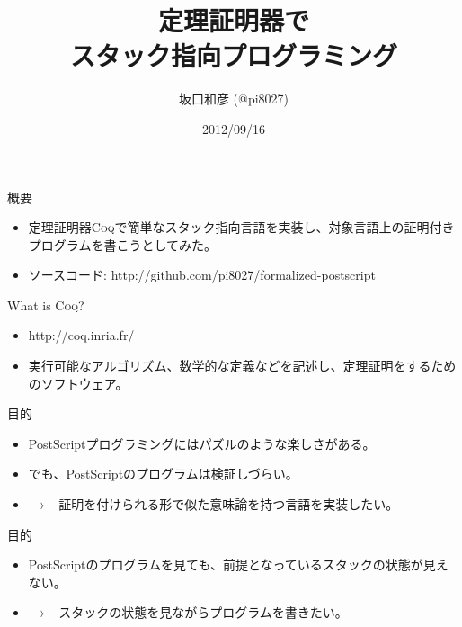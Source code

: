 \documentclass[cjk, 14pt, dvipdfm]{beamer}
\title{定理証明器\Coq{}で\\スタック指向プログラミング}
\author{坂口和彦 (@pi8027)}
\institute{筑波大学 情報学群 情報科学類 B2}
\date{2012/09/16}
\newcommand{\Coq}{{\scshape{}Coq}}
\begin{document}
\begin{frame}[plain]

 \maketitle

\end{frame}

\begin{frame}{概要}

  \begin{itemize}
    \item 定理証明器\Coq{}で簡単なスタック指向言語を実装し、対象言語上の証明付きプログラムを書こうとしてみた。
    \item ソースコード: http://github.com/pi8027/formalized-postscript
  \end{itemize}

\end{frame}

\begin{frame}{What is \Coq?}

  \begin{itemize}
    \item http://coq.inria.fr/
    \item 実行可能なアルゴリズム、数学的な定義などを記述し、定理証明をするためのソフトウェア。
  \end{itemize}

\end{frame}

\begin{frame}{目的}

  \begin{itemize}
    \item PostScriptプログラミングにはパズルのような楽しさがある。
    \item でも、PostScriptのプログラムは検証しづらい。
    \item $\rightarrow$ \, 証明を付けられる形で似た意味論を持つ言語を実装したい。
  \end{itemize}

\end{frame}

\begin{frame}{目的}

  \begin{itemize}
    \item PostScriptのプログラムを見ても、前提となっているスタックの状態が見えない。
    \item $\rightarrow$ \, スタックの状態を見ながらプログラムを書きたい。
  \end{itemize}

\end{frame}
\end{document}
